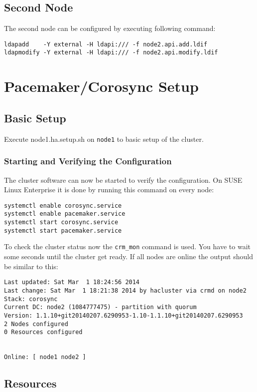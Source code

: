 \documentclass[a4paper,11pt,DIV=12]{scrartcl}
\begin{document}
\subsection{Second Node}
    The second node can be configured by executing following command:
    \begin{verbatim}
ldapadd    -Y external -H ldapi:/// -f node2.api.add.ldif 
ldapmodify -Y external -H ldapi:/// -f node2.api.modify.ldif
    \end{verbatim}

\section{Pacemaker/Corosync Setup}

\subsection{Basic Setup}

    Execute node1.ha.setup.sh on \verb|node1| to basic setup of the cluster.

\subsubsection{Starting and Verifying the Configuration}
    The cluster software can now be started to verify the configuration. On
    SUSE Linux Enterprise it is done by running this command on every node:
    \begin{verbatim}
systemctl enable corosync.service
systemctl enable pacemaker.service
systemctl start corosync.service
systemctl start pacemaker.service
    \end{verbatim}
    To check the cluster status now the \verb|crm_mon| command is used.
    You have to wait some seconds until the cluster get ready.
    If all nodes are online the output should be similar to this:
    \begin{verbatim}
Last updated: Sat Mar  1 18:24:56 2014
Last change: Sat Mar  1 18:21:38 2014 by hacluster via crmd on node2
Stack: corosync
Current DC: node2 (1084777475) - partition with quorum
Version: 1.1.10+git20140207.6290953-1.10-1.1.10+git20140207.6290953
2 Nodes configured
0 Resources configured


Online: [ node1 node2 ]
    \end{verbatim}


\subsection{Resources}
\end{document}
